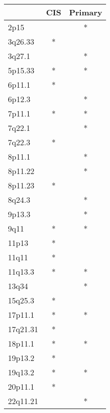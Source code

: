 \begin{tabular}{lcc}
\toprule
{} & CIS & Primary \\
\midrule
2p15     &     &       * \\
3q26.33  &   * &         \\
3q27.1   &     &       * \\
5p15.33  &   * &       * \\
6p11.1   &   * &         \\
6p12.3   &     &       * \\
7p11.1   &   * &       * \\
7q22.1   &     &       * \\
7q22.3   &   * &         \\
8p11.1   &     &       * \\
8p11.22  &     &       * \\
8p11.23  &   * &         \\
8q24.3   &     &       * \\
9p13.3   &     &       * \\
9q11     &   * &       * \\
11p13    &   * &         \\
11q11    &   * &         \\
11q13.3  &   * &       * \\
13q34    &     &       * \\
15q25.3  &   * &         \\
17p11.1  &   * &       * \\
17q21.31 &   * &         \\
18p11.1  &   * &       * \\
19p13.2  &   * &         \\
19q13.2  &   * &       * \\
20p11.1  &   * &         \\
22q11.21 &     &       * \\
\bottomrule
\end{tabular}
